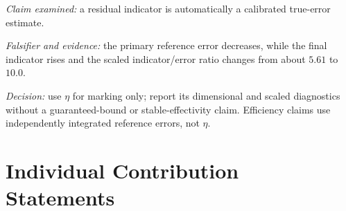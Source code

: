 \documentclass[11pt]{article}
\begin{document}
\noindent\textit{Claim examined:} a residual indicator is automatically a calibrated true-error estimate.

\noindent\textit{Falsifier and evidence:} the primary reference error decreases, while the final indicator rises and the scaled indicator/error ratio changes from about $5.61$ to $10.0$.

\noindent\textit{Decision:} use $\eta$ for marking only; report its dimensional and scaled diagnostics without a guaranteed-bound or stable-effectivity claim. Efficiency claims use independently integrated reference errors, not $\eta$.

\clearpage
\section{Individual Contribution Statements}
\end{document}
